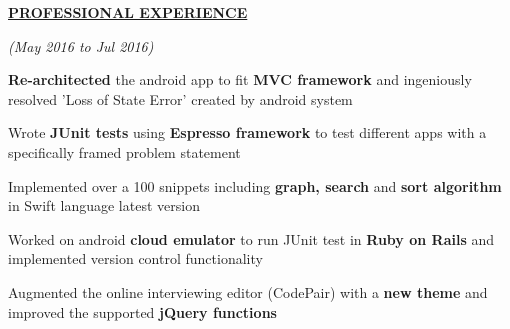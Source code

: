 \documentclass[a4paper]{deedy-resume} %
\begin{document}
\sectionspace

{\uppercase\uline{\textbf{\large{Professional Experience}}\hfill}}
\microspace

\hfill {\textit{\small(May 2016 to Jul 2016)}}\\

\begin{tightitemize}
\item \textbf{Re-architected} the android app to fit \textbf{MVC framework} and ingeniously resolved 'Loss of State Error' created by android system
\item Wrote \textbf{JUnit tests} using \textbf{Espresso framework} to test different apps with a specifically framed problem statement
\item Implemented over a 100 snippets including  \textbf{ graph, search} and \textbf{sort algorithm} in Swift language latest version
\item Worked on android \textbf{cloud emulator} to run JUnit test in \textbf{Ruby on Rails} and implemented version control functionality
\item Augmented the online interviewing editor (CodePair) with a \textbf{new theme} and improved the supported \textbf{jQuery functions} 
\end{tightitemize}
\microspace
\end{document}
